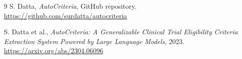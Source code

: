 \documentclass[11pt]{article}
\begin{document}
\begin{thebibliography}{9}
S. Datta, \emph{AutoCriteria}, GitHub repository.\\
\url{https://github.com/surdatta/autocriteria}

S. Datta et al., \emph{AutoCriteria: A Generalizable Clinical Trial Eligibility Criteria Extraction System Powered by Large Language Models}, 2023.\\
\url{https://arxiv.org/abs/2304.06096}
\end{thebibliography}
\end{document}
